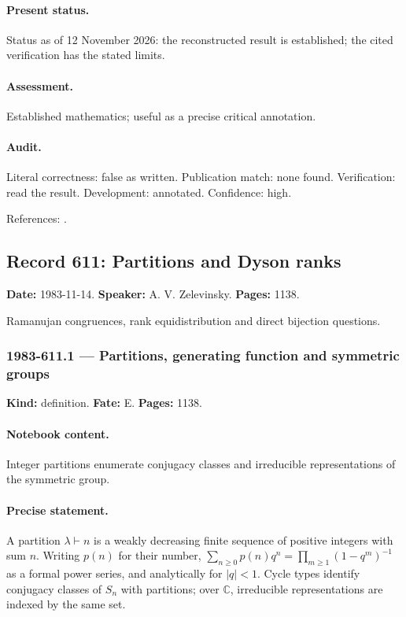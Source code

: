 \paragraph{Present status.} Status as of 12 November 2026: the reconstructed result is established; the cited verification has the stated limits.

\paragraph{Assessment.} Established mathematics; useful as a precise critical annotation.

\paragraph{Audit.} Literal correctness: false as written. Publication match: none found. Verification: read the result. Development: annotated. Confidence: high.

\noindent References: \citep{ising1925ferromagnetismus}.\par

\subsection{Record 611: Partitions and Dyson ranks}

\label{talk:611}

\noindent\textbf{Date:} 1983-11-14. \textbf{Speaker:} A. V. Zelevinsky. \textbf{Pages:} 1138.\par

Ramanujan congruences, rank equidistribution and direct bijection questions.

\subsubsection{1983-611.1 --- Partitions, generating function and symmetric groups}

\label{item:1983-611.1}

\noindent\textbf{Kind:} definition. \textbf{Fate:} E. \textbf{Pages:} 1138.\par

\paragraph{Notebook content.} Integer partitions enumerate conjugacy classes and irreducible representations of the symmetric group.

\paragraph{Precise statement.} A partition $\lambda\vdash n$ is a weakly decreasing finite sequence of positive integers with sum $n$. Writing $p(n)$ for their number, $\sum_{n\ge0}p(n)q^n=\prod_{m\ge1}(1-q^m)^{-1}$ as a formal power series, and analytically for $|q|<1$. Cycle types identify conjugacy classes of $S_n$ with partitions; over $\mathbb C$, irreducible representations are indexed by the same set.

